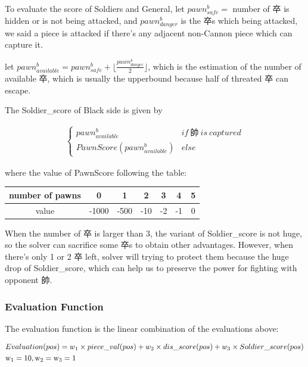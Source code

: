 \documentclass[a4paper, 12pt]{article}  %
\begin{document}
To evaluate the score of Soldiers and General, let $pawn^b_{safe} = $ number of 卒 is hidden or is not being attacked, and $pawn^b_{danger}$ is the 卒s which being attacked, we said a piece is attacked if there's any adjacent non-Cannon piece which can capture it.

let $pawn_{available}^b = pawn^b_{safe} + \lfloor \frac{pawn^b_{danger}}{2} \rfloor$, which is the estimation of the number of available 卒, which is usually the upperbound because half of threated 卒 can escape.

The Soldier\_score of Black side is given by

\begin{align}
\begin{cases}
  pawn_{available}^b & if\  \text{帥}\  is\  captured\\
  PawnScore(pawn_{available}^b) & else
\end{cases}
\end{align}

where the value of PawnScore following the table:

\begin{table}[!h]
  \begin{tabular}{|c|c|c|c|c|c|c|}
    number of pawns & 0 & 1 & 2 & 3 & 4 & 5\\
    \hline
    value & -1000 & -500 & -10 & -2 & -1 & 0
  \end{tabular}
\end{table}



When the number of 卒 is larger than 3, the variant of Soldier\_score is not huge, so the solver can sacrifice some 卒s to obtain other advantages.
However, when there's only 1 or 2 卒 left, solver will trying to protect them because the huge drop of Soldier\_score, which can help us to preserve the power for fighting with opponent 帥.

\subsubsection{Evaluation Function}

The evaluation function is the linear combination of the evaluations above:

\begin{align*}
  \rm &Evaluation(pos) = w_1 \times piece\_val(pos) + w_2 \times dis\_score(pos) + w_3 \times Soldier\_score(pos)\\
  &\rm w_1=10, w_2=w_3=1
\end{align*}
\end{document}
